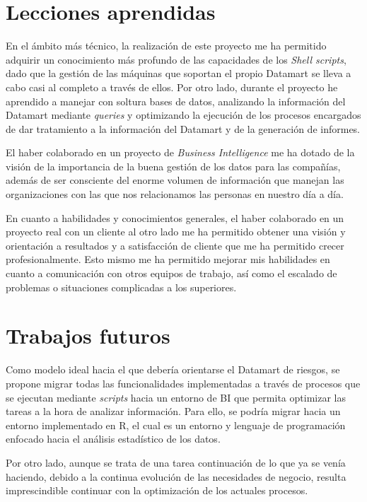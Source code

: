 \documentclass[a4paper, 12pt]{book}
\begin{document}
\section{Lecciones aprendidas}
\label{sec:lecciones_aprendidas}

En el ámbito más técnico, la realización de este proyecto me ha permitido adquirir un conocimiento más profundo de las capacidades de los \textit{Shell scripts}, dado que la gestión de las máquinas que soportan el propio Datamart se lleva a cabo casi al completo a través de ellos. Por otro lado, durante el proyecto he aprendido a manejar con soltura bases de datos, analizando la información del Datamart mediante \textit{queries} y optimizando la ejecución de los procesos encargados de dar tratamiento a la información del Datamart y de la generación de informes.

El haber colaborado en un proyecto de \textit{Business Intelligence} me ha dotado de la visión de la importancia de la buena gestión de los datos para las compañías, además de ser consciente del enorme volumen de información que manejan las organizaciones con las que nos relacionamos las personas en nuestro día a día.

En cuanto a habilidades y conocimientos generales, el haber colaborado en un proyecto real con un cliente al otro lado me ha permitido obtener una visión y orientación a resultados y a satisfacción de cliente que me ha permitido crecer profesionalmente. Esto mismo me ha permitido mejorar mis habilidades en cuanto a comunicación con otros equipos de trabajo, así como el escalado de problemas o situaciones complicadas a los superiores.

\section{Trabajos futuros}
\label{sec:trabajos_futuros}

Como modelo ideal hacia el que debería orientarse el Datamart de riesgos, se propone migrar todas las funcionalidades implementadas a través de procesos que se ejecutan mediante \textit{scripts} hacia un entorno de BI que permita optimizar las tareas a la hora de analizar información. Para ello, se podría migrar hacia un entorno implementado en R, el cual es un entorno y lenguaje de programación enfocado hacia el análisis estadístico de los datos.

Por otro lado, aunque se trata de una tarea continuación de lo que ya se venía haciendo, debido a la continua evolución de las necesidades de negocio, resulta imprescindible continuar con la optimización de los actuales procesos.
\end{document}
